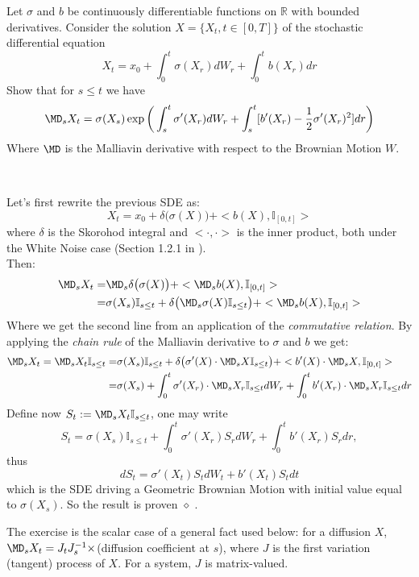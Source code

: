 \begin{exe}
Let $\sigma$ and $b$ be continuously differentiable functions on $\mathbb{R}$ with bounded
derivatives. Consider the solution $X = \{X_t, t \in [0, T]\}$ of the stochastic
differential equation
$$ X_t = x_0 + \int_0^t\sigma(X_r)dW_r + \int_0^tb(X_r)dr$$
Show that for $s\leq t$ we have
$$ \MD_sX_t = \sigma(X_s)\exp\bigg(\int_s^t\sigma'(X_r)dW_r  + \int_s^t[b'(X_r)-\frac{1}{2}\sigma'(X_r)^2]dr  \bigg) $$
Where $\MD$ is the Malliavin derivative with respect to the Brownian Motion $W$.
\end{exe}\
\\
\begin{sol}
Let's first rewrite the previous SDE as:
$$ X_t = x_0 + \delta\big(\sigma(X)\big) + <b(X),\mathbb{I}_{[0,t]}> $$
where $\delta$ is the Skorohod integral and $<\cdot, \cdot>$ is the inner product, both under the White Noise case (Section 1.2.1 in \cite{nualart}).\\
Then:
\begin{align*}
\MD_sX_t = & \MD_s\delta\big(\sigma(X)\big) + <\MD_sb(X),\mathbb{I}_{[0,t]}>\\
= & \sigma(X_s)\mathbb{I}_{s\leq t} + \delta\big(\MD_s\sigma(X)\mathbb{I}_{s\leq t}\big) +  <\MD_sb(X),\mathbb{I}_{[0,t]}>
\end{align*} 
Where we get the second line from an application of the \textit{commutative relation}.
By applying the \textit{chain rule} of the Malliavin derivative to $\sigma$ and $b$ we get:
\begin{align*}
\MD_sX_t =\MD_sX_t\mathbb{I}_{s\leq t}= & \sigma(X_s)\mathbb{I}_{s\leq t} + \delta\big( \sigma'(X)\cdot \MD_sX \mathbb{I}_{s\leq t}\big) + < b'(X) \cdot\MD_s X,\mathbb{I}_{[0,t]}>\\
= & \sigma(X_s) + \int_0^t \sigma'(X_r)\cdot\MD_sX_r \mathbb{I}_{s\leq t} dW_r + \int_0^t b'(X_r) \cdot\MD_s X_r\mathbb{I}_{s\leq t} dr
\end{align*} 
Define now $S_t:= \MD_sX_t\mathbb{I}_{s\leq t}$, one may write
$$ S_t = \sigma(X_s)\mathbb{I}_{s\leq t} + \int_0^t \sigma'(X_r)S_rdW_r + \int_0^t b'(X_r) S_rdr,$$
thus
$$ dS_t = \sigma'(X_t)S_tdW_t + b'(X_t) S_t dt$$
which is the SDE driving a Geometric Brownian Motion with initial value equal to $\sigma(X_s)$. So the result is proven $\diamond$ .
\end{sol}

The exercise is the scalar case of a general fact used below: for a diffusion $X$, $\MD_sX_t=J_tJ_s^{-1}\times$(diffusion coefficient at $s$), where $J$ is the first variation (tangent) process of $X$. For a system, $J$ is matrix-valued.

